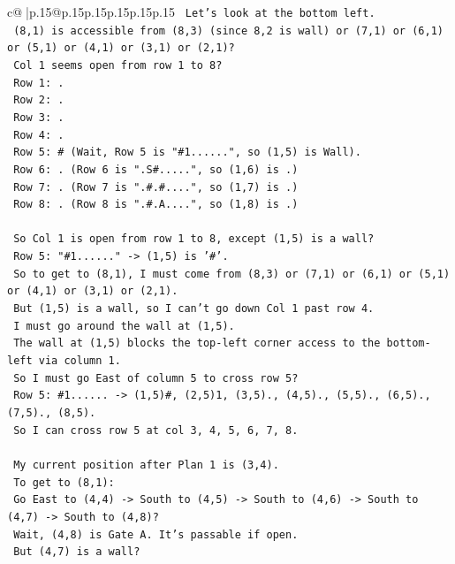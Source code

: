 \documentclass{article}
\begin{document}
{\begin{supertabular}{c@{$\;$}|p{.15\linewidth}@{}p{.15\linewidth}p{.15\linewidth}p{.15\linewidth}p{.15\linewidth}p{.15\linewidth}}
{{{\texttt{   Let's look at the bottom left.} \\
\texttt{   (8,1) is accessible from (8,3) (since 8,2 is wall) or (7,1) or (6,1) or (5,1) or (4,1) or (3,1) or (2,1)?} \\
\texttt{   Col 1 seems open from row 1 to 8?} \\
\texttt{   Row 1: .} \\
\texttt{   Row 2: .} \\
\texttt{   Row 3: .} \\
\texttt{   Row 4: .} \\
\texttt{   Row 5: \# (Wait, Row 5 is "\#1......", so (1,5) is Wall).} \\
\texttt{   Row 6: . (Row 6 is ".S\#.....", so (1,6) is .)} \\
\texttt{   Row 7: . (Row 7 is ".\#.\#....", so (1,7) is .)} \\
\texttt{   Row 8: . (Row 8 is ".\#.A....", so (1,8) is .)} \\
\\ 
\texttt{   So Col 1 is open from row 1 to 8, except (1,5) is a wall?} \\
\texttt{   Row 5: "\#1......" {-}> (1,5) is '\#'.} \\
\texttt{   So to get to (8,1), I must come from (8,3) or (7,1) or (6,1) or (5,1) or (4,1) or (3,1) or (2,1).} \\
\texttt{   But (1,5) is a wall, so I can't go down Col 1 past row 4.} \\
\texttt{   I must go around the wall at (1,5).} \\
\texttt{   The wall at (1,5) blocks the top{-}left corner access to the bottom{-}left via column 1.} \\
\texttt{   So I must go East of column 5 to cross row 5?} \\
\texttt{   Row 5: \#1...... {-}> (1,5)\#, (2,5)1, (3,5)., (4,5)., (5,5)., (6,5)., (7,5)., (8,5).} \\
\texttt{   So I can cross row 5 at col 3, 4, 5, 6, 7, 8.} \\
\\ 
\texttt{   My current position after Plan 1 is (3,4).} \\
\texttt{   To get to (8,1):} \\
\texttt{   Go East to (4,4) {-}> South to (4,5) {-}> South to (4,6) {-}> South to (4,7) {-}> South to (4,8)?} \\
\texttt{   Wait, (4,8) is Gate A. It's passable if open.} \\
\texttt{   But (4,7) is a wall?} \\
}}}
\end{supertabular}}
\end{document}
